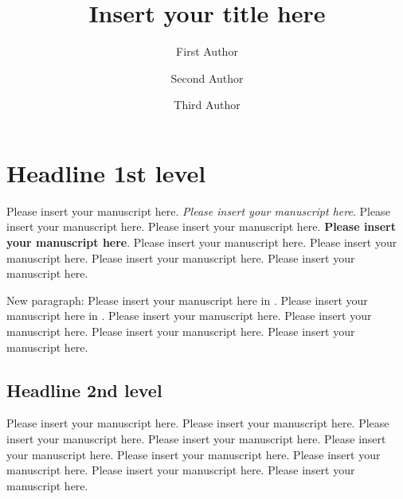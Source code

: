 \documentclass[USenglish,twocolumn]{article}
\begin{document}

\title{Insert your title here}

\author*[1]{First Author}
\author[2]{Second Author}
\author[2]{Third Author} 

	



\maketitle

\section{Headline 1st level} 

Please insert your manuscript here. \textit{Please insert your manuscript here}. Please insert your manuscript here. Please insert your manuscript here. \textbf{Please insert your manuscript here}. Please insert your manuscript here. Please insert your manuscript here. Please insert your manuscript here. Please insert your manuscript here.

New paragraph: Please insert your manuscript here in \citep{2,3,4,5}. Please insert your manuscript here in \citep{1}. Please insert your manuscript here. Please insert your manuscript here. Please insert your manuscript here. Please insert your manuscript here.

\subsection{Headline 2nd level}
Please insert your manuscript here. Please insert your manuscript here. Please insert your manuscript here. Please insert your manuscript here. Please insert your manuscript here. Please insert your manuscript here. Please insert your manuscript here. Please insert your manuscript here. Please insert your manuscript here.
\end{document}
